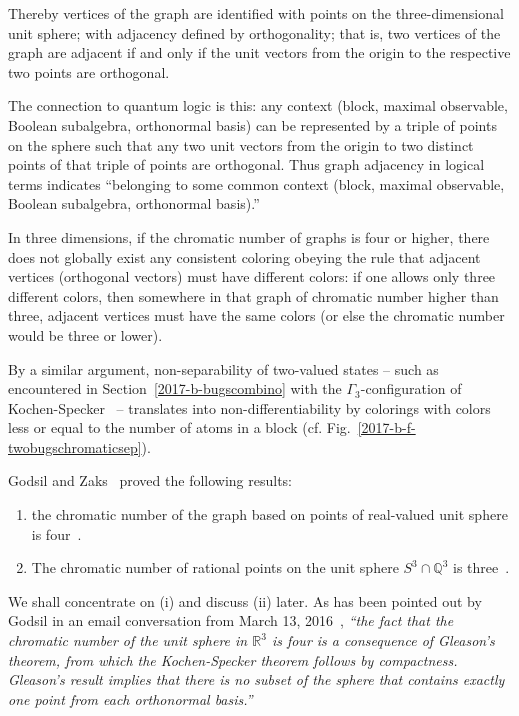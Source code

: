 \documentclass[%
  twocolumn,
 showpacs,
 showkeys,
 preprintnumbers,
 amsmath,amssymb,
 aps,
  pra,
  longbibliography,
 floatfix,
 ]{revtex4-1}
\begin{document}
Thereby vertices of the graph are identified with points on the three-dimensional unit sphere;
with adjacency  defined by orthogonality; that is,
two vertices of the graph are adjacent if and only if the unit vectors from the origin
to the respective two points are orthogonal.

The connection to quantum logic is this: any context
(block, maximal observable, Boolean subalgebra, orthonormal basis)
can be represented by a triple of points on the sphere
such that any two unit vectors from the origin
to two distinct points of that triple of points are orthogonal.
Thus graph adjacency in logical terms indicates
``belonging to some common context (block, maximal observable, Boolean subalgebra, orthonormal basis).''

In three dimensions, if the chromatic number of  graphs is four or higher,
there does not globally exist any consistent
coloring obeying the rule that adjacent vertices (orthogonal vectors)
must have different colors: if one allows only three different colors,
then somewhere in that graph of chromatic number higher than three, adjacent vertices must have the same colors
(or else the chromatic number would be three or lower).


By a similar argument, non-separability of two-valued states
--
such as encountered in Section~\ref{2017-b-bugscombino}
with the $\Gamma_3$-configuration of Kochen-Specker~\cite[p.~70]{kochen1}
-- translates into non-differentiability by colorings
with colors less or equal to the number of atoms in a block
(cf. Fig.~\ref{2017-b-f-twobugschromaticsep}).

Godsil and Zaks~\cite{godsil-zaks,havlicek-2000}  proved the following results:
\begin{enumerate}
\item
the chromatic number of the graph based on points of real-valued unit sphere
is four~\cite[Lemma~1.1]{godsil-zaks}.
\item
The chromatic number of rational points on the  unit sphere
$S^3\cap \mathbb{Q}^3$
is three~\cite[Lemma~1.2]{godsil-zaks}.
\end{enumerate}

We shall concentrate on (i) and discuss (ii) later.
As has been pointed out by Godsil in an email conversation from March 13, 2016~\cite{godsil-pc},
{\em ``the fact that the chromatic number of the unit sphere in $\mathbb{R}^3$
is four is a consequence of  Gleason's theorem,
from which the Kochen-Specker theorem follows by compactness.
Gleason's result implies that there is no subset of the sphere that contains exactly one point from each orthonormal basis.''}
\end{document}
